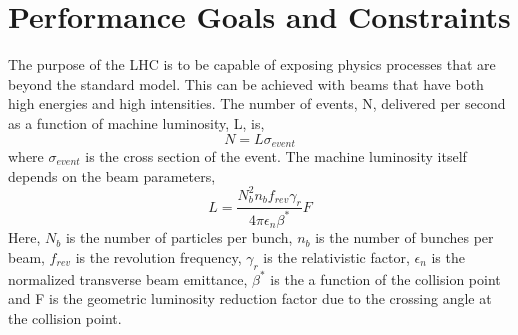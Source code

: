 \section{Performance Goals and Constraints}
The purpose of the LHC is to be
capable of exposing physics processes that are beyond the standard
model. This can be achieved with beams %
that have both high energies and high intensities.
The number of events, N, delivered per second as a function
of machine luminosity, L, is,
\begin{equation}
N=L\sigma_{event}
\end{equation}
where $\sigma_{event}$ is the cross section of the event.
The machine luminosity itself depends on the beam parameters,
\begin{equation}
L=\frac{N_{b}^{2}n_{b}f_{rev}\gamma_{r}}{4\pi \epsilon_{n}\beta^{*}}F
\end{equation}
Here, $N_{b}$ is the number of particles per bunch, $n_{b}$
is the number of bunches per beam, $f_{rev}$ is the
revolution frequency, $\gamma_{r}$ is the relativistic factor, 
$\epsilon_{n}$ is the normalized transverse beam
emittance, $\beta^{*}$ is the a function of the collision point
and F is the geometric luminosity reduction factor due to the crossing
angle at the collision point. 


